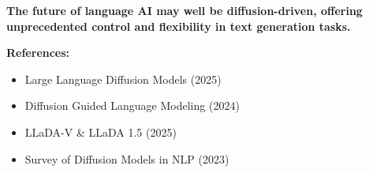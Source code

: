 \documentclass[a1paper,portrait]{baposter}
\begin{document}
\begin{poster}
{\vspace{0.5em}
\textbf{The future of language AI may well be diffusion-driven, offering unprecedented control and flexibility in text generation tasks.}

\vspace{0.5em}
\textbf{References:}
\begin{itemize}[leftmargin=*,itemsep=0pt]
    \item Large Language Diffusion Models (2025)
    \item Diffusion Guided Language Modeling (2024)
    \item LLaDA-V \& LLaDA 1.5 (2025)
    \item Survey of Diffusion Models in NLP (2023)
\end{itemize}
}

\end{poster}
\end{document}
